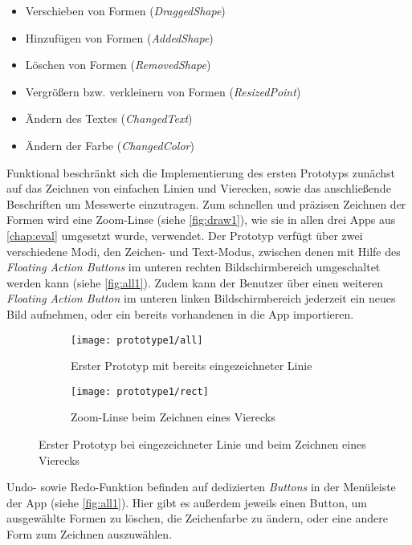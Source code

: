 \begin{itemize}
  \item Verschieben von Formen (\emph{DraggedShape})
  \item Hinzufügen von Formen (\emph{AddedShape})
  \item Löschen von Formen (\emph{RemovedShape})
  \item Vergrößern bzw. verkleinern von Formen (\emph{ResizedPoint})
  \item Ändern des Textes (\emph{ChangedText})
  \item Ändern der Farbe (\emph{ChangedColor})
\end{itemize}

\noindent
Funktional beschränkt sich die Implementierung des ersten Prototyps zunächst auf das Zeichnen von einfachen Linien und Vierecken, sowie das anschließende Beschriften um Messwerte einzutragen.
Zum schnellen und präzisen Zeichnen der Formen wird eine Zoom-Linse (siehe \autoref{fig:draw1}), wie sie in allen drei Apps aus \autoref{chap:eval} umgesetzt wurde, verwendet.
Der Prototyp verfügt über zwei verschiedene Modi, den Zeichen- und Text-Modus, zwischen denen mit Hilfe des \emph{Floating Action Buttons} im unteren rechten Bildschirmbereich umgeschaltet werden kann (siehe \autoref{fig:all1}).
Zudem kann der Benutzer über einen weiteren \emph{Floating Action Button} im unteren linken Bildschirmbereich jederzeit ein neues Bild aufnehmen, oder ein bereits vorhandenen in die App importieren.

\begin{figure}[h]
  \begin{subfigure}[t]{0.4\textwidth}
    \texttt{[image: prototype1/all]}
    \caption{Erster Prototyp mit bereits eingezeichneter Linie}
    \label{fig:all1}
  \end{subfigure}
  \begin{subfigure}[t]{0.4\textwidth}
    \texttt{[image: prototype1/rect]}
    \caption{Zoom-Linse beim Zeichnen eines Vierecks}
    \label{fig:draw1}
  \end{subfigure}
  \centering
  \caption{Erster Prototyp bei eingezeichneter Linie und beim Zeichnen eines Vierecks}
\end{figure}

Undo- sowie Redo-Funktion befinden auf dedizierten \emph{Buttons} in der Menüleiste der App (siehe \autoref{fig:all1}).
Hier gibt es außerdem jeweils einen Button, um ausgewählte Formen zu löschen, die Zeichenfarbe zu ändern, oder eine andere Form zum Zeichnen auszuwählen. \\

